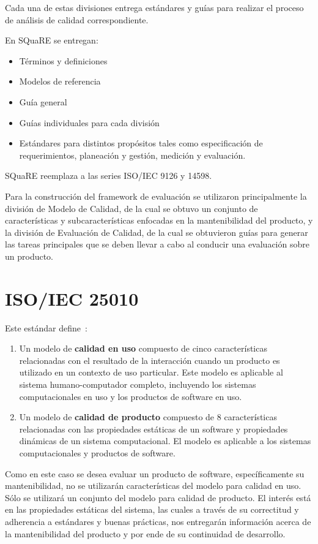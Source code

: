 Cada una de estas divisiones entrega estándares y guías para realizar
el proceso de análisis de calidad correspondiente.

En SQuaRE se entregan:
\begin{itemize}
    \item Términos y definiciones
    \item Modelos de referencia
    \item Guía general
    \item Guías individuales para cada división
    \item Estándares para distintos propósitos tales como especificación de requerimientos,
    planeación y gestión, medición y evaluación.
\end{itemize}

SQuaRE reemplaza a las series ISO/IEC 9126 y 14598.

Para la construcción del framework de evaluación se utilizaron 
principalmente la división de Modelo de Calidad, de la cual
se obtuvo un conjunto de características  y subcaracterísticas enfocadas en la mantenibilidad del 
producto, y la división de Evaluación de Calidad, de la cual se obtuvieron
guías para generar las tareas principales que se deben llevar a cabo al conducir una evaluación
sobre un producto.

\section{ISO/IEC 25010}

Este estándar define~\cite{25010}:

\begin{enumerate}
    \item Un modelo de \textbf{calidad en uso} compuesto de cinco características
    relacionadas con el resultado de la interacción cuando un producto es utilizado
    en un contexto de uso particular. Este modelo es aplicable al sistema
    humano-computador completo, incluyendo los sistemas computacionales en uso
    y los productos de software en uso.
    \item Un modelo de \textbf{calidad de producto} compuesto de 8 características relacionadas
    con las propiedades estáticas de un software y propiedades dinámicas de un sistema
    computacional. El modelo es aplicable a los sistemas computacionales y productos
    de software.
\end{enumerate}

Como en este caso se desea evaluar un producto de software, específicamente
su mantenibilidad, no se utilizarán características del modelo para calidad
en uso. Sólo se utilizará un conjunto del modelo para calidad de producto.
El interés está en las propiedades estáticas del sistema, las cuales
a través de su correctitud y adherencia a estándares y buenas prácticas, nos
entregarán información acerca de la mantenibilidad del producto y por ende
de su continuidad de desarrollo.

